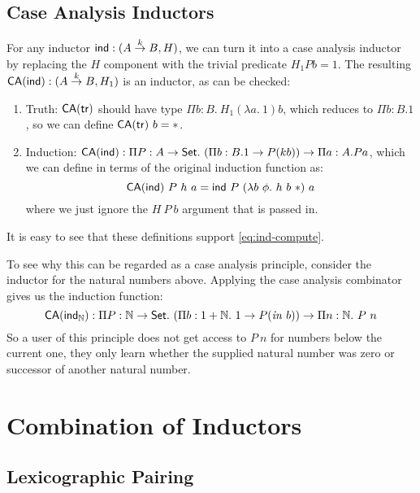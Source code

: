 \documentclass{amsart}
\newcommand{\Set}{\mathsf{Set}}
\newcommand{\inn}{\mathit{in}}
\begin{document}
\subsection{Case Analysis Inductors}

For any inductor $\mathsf{ind} : (A \stackrel{k}\to B, H)$, we can turn it
into a case analysis inductor by replacing the $H$ component with the
trivial predicate $H_1Pb = 1$. The resulting $\mathsf{CA}(\mathsf{ind}) : (A
\stackrel{k}\to B, H_1)$ is an inductor, as can be checked:
\begin{enumerate}
\item Truth: $\mathsf{CA}(\mathsf{tr})$ should have type $\Pi b : B.\ H_1(\lambda a.\
  1)b$, which reduces to $\Pi b : B. 1$, so we can define $\mathsf{CA}(\mathsf{tr})\ b
  = *$.
\item Induction: $\mathsf{CA}(\ind) : \Pi P : A \to \Set.\ (\Pi b : B. 1 \to P(k
  b)) \to \Pi a : A. P a$, which we can define in terms of the
  original induction function as:
  \begin{displaymath}
    \mathsf{CA}(\ind)\ P\ h\ a = \ind\ P\ (\lambda b\ \phi.\ h\ b\ *)\ a
  \end{displaymath}
  where we just ignore the $H\ P\ b$ argument that is passed in.
\end{enumerate}
It is easy to see that these definitions support
\autoref{eq:ind-compute}.

To see why this can be regarded as a case analysis principle, consider
the inductor for the natural numbers above. Applying the case analysis
combinator gives us the induction function:
\begin{displaymath}
  \mathsf{CA}(\ind_{\mathbb{N}}) : \Pi P : \mathbb{N} \to \Set.\ (\Pi b : 1 + \mathbb{N}.\ 1 \to P(\inn\ b)) \to \Pi n : \mathbb{N}.\ P\ n
\end{displaymath}
So a user of this principle does not get access to $P\ n$ for numbers
below the current one, they only learn whether the supplied natural
number was zero or successor of another natural number.

\section{Combination of Inductors}

\subsection{Lexicographic Pairing}
\end{document}
